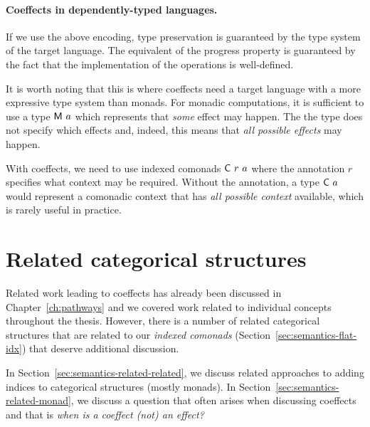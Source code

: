 \paragraph{Coeffects in dependently-typed languages.}
If we use the above encoding, type preservation is guaranteed by the type
system of the target language. The equivalent of the progress property is guaranteed by the
fact that the implementation of the operations is well-defined.

It is worth noting that this is where coeffects need a target language with a more expressive
type system than monads. For monadic computations, it is sufficient to use a type $\textnormal{\sffamily M}~a$
which represents that \emph{some} effect may happen. The the type does not specify which effects
and, indeed, this means that \emph{all possible effects} may happen.

With coeffects, we need to use indexed comonads $\textnormal{\sffamily C}~r~a$ where the annotation $r$ specifies
what context may be required. Without the annotation, a type $\textnormal{\sffamily C}~a$ would represent a
comonadic context that has \emph{all possible context} available, which is rarely useful in practice.



%
%

\section{Related categorical structures}
\label{sec:semantics-related}

Related work leading to coeffects has already been discussed in Chapter~\ref{ch:pathways}
and we covered work related to individual concepts throughout the thesis. However, there is a
number of related categorical structures that are related to our \emph{indexed comonads}
(Section~\ref{sec:semantics-flat-idx}) that deserve additional discussion.

In Section~\ref{sec:semantics-related-related}, we discuss related approaches to adding
indices to categorical structures (mostly monads). In Section~\ref{sec:semantics-related-monad},
we discuss a question that often arises when discussing coeffects and that is
\emph{when is a coeffect (not) an effect?}

